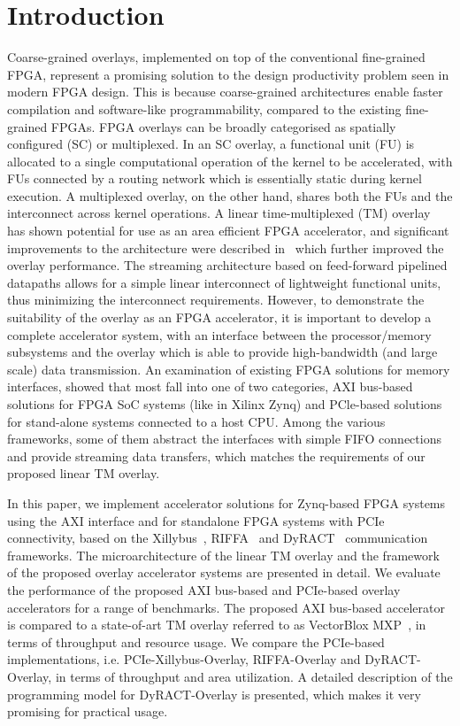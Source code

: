 \section{Introduction}
Coarse-grained overlays, implemented on top of the conventional fine-grained FPGA, represent a promising solution to the design productivity problem seen in modern FPGA design. This is because coarse-grained architectures enable faster compilation and software-like programmability, compared to the existing fine-grained FPGAs.  
FPGA overlays can be broadly categorised as spatially configured (SC) or multiplexed. In an SC overlay, a functional unit (FU) is allocated to a single computational operation of the kernel to be accelerated, with FUs connected by a routing network which is essentially static during kernel execution. A multiplexed overlay, on the other hand, shares both the FUs and the interconnect across kernel operations.
A linear time-multiplexed (TM) overlay~\cite{li2016area} has shown potential for use as an area efficient FPGA accelerator, and significant improvements to the architecture were described in~\cite{li2018time} which further improved the overlay performance. 
The streaming architecture based on feed-forward pipelined datapaths allows for a simple linear interconnect of lightweight functional units, thus minimizing the interconnect requirements. 
However, to demonstrate the suitability of the overlay as an FPGA accelerator, it is important to develop a complete accelerator system, with an interface between the processor/memory subsystems and the overlay which is able to provide high-bandwidth (and large scale) data transmission.
An examination of existing FPGA solutions for memory interfaces, showed that most fall into one of two categories, AXI bus-based solutions for FPGA SoC systems (like in Xilinx Zynq) and PCle-based solutions for stand-alone systems connected to a host CPU. 
Among the various frameworks, some of them abstract the interfaces with simple FIFO connections and provide streaming data transfers, which matches the requirements of our proposed linear TM overlay. 

In this paper, we implement accelerator solutions for Zynq-based FPGA systems using the AXI interface and for standalone FPGA systems with PCIe connectivity, based on the Xillybus~\cite{xillybus2018}, RIFFA~\cite{jacobsen2015riffa} and DyRACT~\cite{vipin2014dyract} communication frameworks. 
The microarchitecture of the linear TM overlay and the framework of the proposed overlay accelerator systems are presented in detail. 
We evaluate the performance of the proposed AXI bus-based and PCIe-based overlay accelerators for a range of benchmarks. 
The proposed AXI bus-based accelerator is compared to a state-of-art TM overlay referred to as VectorBlox MXP~\cite{severance2013embedded}, in terms of throughput and resource usage. 
We compare the PCIe-based implementations, i.e. PCIe-Xillybus-Overlay, RIFFA-Overlay and DyRACT-Overlay, in terms of throughput and area utilization. 
A detailed description of the programming model for DyRACT-Overlay is presented, which makes it very promising for practical usage.


